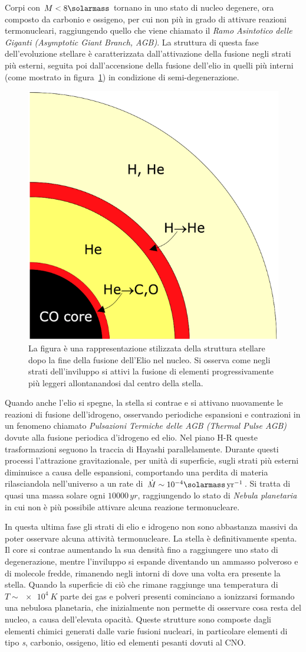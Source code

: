 Corpi con $M < 8\si{\solarmass}$ tornano in uno stato di nucleo degenere, ora composto da carbonio e ossigeno, per cui non più in grado di attivare reazioni termonucleari, raggiungendo quello che viene chiamato il \emph{Ramo Asintotico delle Giganti (Asymptotic Giant Branch, AGB)}. La struttura di questa fase dell'evoluzione stellare è caratterizzata dall'attivazione della fusione negli strati più esterni, seguita poi dall'accensione della fusione dell'elio in quelli più interni (come mostrato in figura~\ref{fig:AGB}) in condizione di semi-degenerazione.
\begin{figure}
    \centering
    \includegraphics[width = 0.3 \textwidth]{immagini/AGB.png}
    \caption{La figura è una rappresentazione stilizzata della struttura stellare dopo la fine della fusione dell'Elio nel nucleo. Si osserva come negli strati dell'inviluppo si attivi la fusione di elementi progressivamente più leggeri allontanandosi dal centro della stella.}\label{fig:AGB}
\end{figure}
Quando anche l'elio si spegne, la stella si contrae e si attivano nuovamente le reazioni di fusione dell'idrogeno, osservando periodiche espansioni e contrazioni in un fenomeno chiamato \emph{Pulsazioni Termiche delle AGB (Thermal Pulse AGB)} dovute alla fusione periodica d'idrogeno ed elio. Nel piano H-R queste trasformazioni seguono la traccia di Hayashi parallelamente. Durante questi processi l'attrazione gravitazionale, per unità di superficie, sugli strati più esterni diminuisce a causa delle espansioni, comportando una perdita di materia rilasciandola nell'universo a un rate di $\dot{M} \sim 10^{-4} \si{\solarmass.{yr}^{-1}}$. Si tratta di quasi una massa solare ogni $10000 \, \si{yr}$, raggiungendo lo stato di \textit{Nebula planetaria} in cui non è più possibile attivare alcuna reazione termonucleare.

In questa ultima fase gli strati di elio e idrogeno non sono abbastanza massivi da poter osservare alcuna attività termonucleare. La stella è definitivamente spenta. Il core si contrae aumentando la sua densità fino a raggiungere uno stato di degenerazione, mentre l'inviluppo si espande diventando un ammasso polveroso e di molecole fredde, rimanendo negli intorni di dove una volta era presente la stella. Quando la superficie di ciò che rimane raggiunge una temperatura di $T \sim \SI{e4}{K}$ parte dei gas e polveri presenti cominciano a ionizzarsi formando una nebulosa planetaria, che inizialmente non permette di osservare cosa resta del nucleo, a causa dell'elevata opacità. Queste strutture sono composte dagli elementi chimici generati dalle varie fusioni nucleari, in particolare elementi di tipo \emph{s}, carbonio, ossigeno, litio ed elementi pesanti dovuti al CNO.